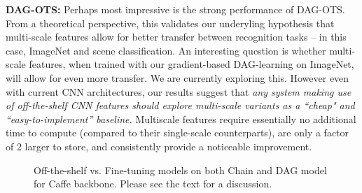 \documentclass[10pt,twocolumn,letterpaper]{article}
\begin{document}
{\bf DAG-OTS:} Perhaps most impressive is the strong performance of DAG-OTS. From a theoretical perspective, this validates our underyling hypothesis that multi-scale features allow for better transfer between recognition tasks -- in this case, ImageNet and scene classification. An interesting question is whether multi-scale features, when trained with our gradient-based DAG-learning on ImageNet, will allow for even more transfer. We are currently exploring this. However even with current CNN architectures, our results suggest that {\em any system making use of off-the-shelf CNN features should explore multi-scale variants as a ``cheap" and ``easy-to-implement'' baseline.}  Multiscale features require essentially no additional time to compute (compared to their single-scale counterparts),  are only a factor of 2 larger to store, and consistently provide a noticeable improvement.


\begin{figure}[t]
\centering
	
\caption{Off-the-shelf vs. Fine-tuning models on both Chain and DAG model for Caffe backbone. Please see the text for a discussion.}
\label{fig:comp_otf}
\end{figure}
\end{document}
